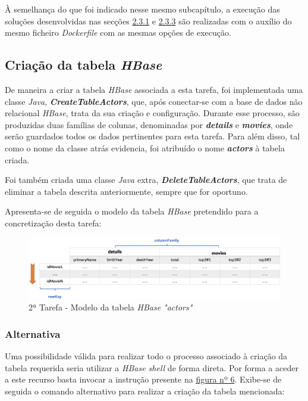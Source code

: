\documentclass[a4paper]{report}
\begin{document}
{		À semelhança do que foi indicado nesse mesmo subcapítulo, a execução das soluções desenvolvidas nas secções \hyperref[subsec:Task2-1]{2.3.1} e \hyperref[subsec:Task2-3]{2.3.3} são realizadas com o auxílio do mesmo ficheiro \textit{Dockerfile} com as mesmas opções de execução.
		
		\subsection{Criação da tabela \textit{HBase}} \label{subsec:Task2-1}
		De maneira a criar a tabela \textit{HBase} associada a esta tarefa, foi implementada uma classe \textit{Java}, \textbf{\textit{CreateTableActors}}, que, após conectar-se com a base de dados não relacional \textit{HBase}, trata da sua criação e configuração.
		Durante esse processo, são produzidas duas famílias de colunas, denominadas por \textbf{\textit{details}} e \textbf{\textit{movies}}, onde serão guardados todos os dados pertinentes para esta tarefa. Para além disso, tal como o nome da classe atrás evidencia, foi atribuído o nome \textbf{\textit{actors}} à tabela criada.
		
		Foi também criada uma classe \textit{Java} extra, \textbf{\textit{DeleteTableActors}}, que trata de eliminar a tabela descrita anteriormente, sempre que for oportuno.
		
		Apresenta-se de seguida o modelo da tabela \textit{HBase} pretendido para a concretização desta tarefa:
		\begin{figure}[H]
			\centering
			\includegraphics[width=1.0\textwidth]{Imagens/2ª Tarefa - Tabela Hbase.png}
			\caption{2ª Tarefa - Modelo da tabela \textit{HBase "actors"}}
			\label{fig:13}
		\end{figure}
		
		\subsubsection{Alternativa}
		Uma possibilidade válida para realizar todo o processo associado à criação da tabela requerida seria utilizar a \textit{HBase shell} de forma direta. Por forma a aceder a este recurso basta invocar a instrução presente na \hyperref[fig:6]{figura nº 6}.
		Exibe-se de seguida o comando alternativo para realizar a criação da tabela mencionada:
		
}
\end{document}
